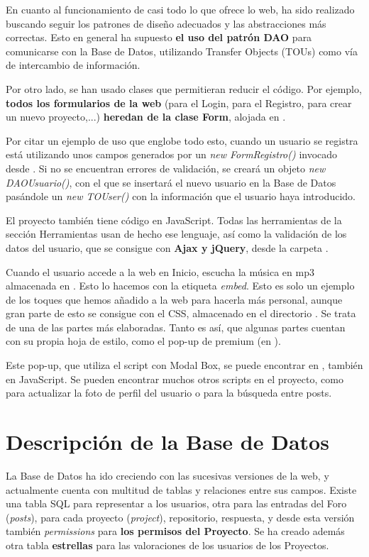 \documentclass[12pt]{report}
\begin{document}
En cuanto al funcionamiento de casi todo lo que ofrece lo web, ha sido realizado buscando seguir los patrones de diseño adecuados y las abstracciones más correctas. Esto en general ha supuesto \textbf{el uso del patrón DAO} para comunicarse con la Base de Datos, utilizando Transfer Objects (TOUs) como vía de intercambio de información.

Por otro lado, se han usado clases que permitieran reducir el código. Por ejemplo, \textbf{todos los formularios de la web} (para el Login, para el Registro, para crear un nuevo proyecto,...) \textbf{heredan de la clase Form}, alojada en .

Por citar un ejemplo de uso que englobe todo esto, cuando un usuario se registra está utilizando unos campos generados por un \textit{new FormRegistro()} invocado desde . Si no se encuentran errores de validación, se creará un objeto \textit{new DAOUsuario()}, con el que se insertará el nuevo usuario en la Base de Datos pasándole un \textit{new TOUser()} con la información que el usuario haya introducido.

El proyecto también tiene código en JavaScript. Todas las herramientas de la sección Herramientas usan de hecho ese lenguaje, así como la validación de los datos del usuario, que se consigue con \textbf{Ajax y jQuery}, desde la carpeta .

Cuando el usuario accede a la web en Inicio, escucha la música en mp3 almacenada en . Esto lo hacemos con la etiqueta \textit{embed}. Esto es solo un ejemplo de los toques que hemos añadido a la web para hacerla más personal, aunque gran parte de esto se consigue con el CSS, almacenado en el directorio . Se trata de una de las partes más elaboradas. Tanto es así, que algunas partes cuentan con su propia hoja de estilo, como el pop-up de premium (en ).

Este pop-up, que utiliza el script con Modal Box, se puede encontrar en , también en JavaScript. Se pueden encontrar muchos otros scripts en el proyecto, como  para actualizar la foto de perfil del usuario o  para la búsqueda entre posts.

\section{Descripción de la Base de Datos}

La Base de Datos ha ido creciendo con las sucesivas versiones de la web, y actualmente cuenta con multitud de tablas y relaciones entre sus campos. Existe una tabla SQL para representar a los usuarios, otra para las entradas del Foro (\textit{posts}), para cada proyecto (\textit{project}), repositorio, respuesta, y desde esta versión también \textit{permissions} para \textbf{los permisos del Proyecto}. Se ha creado además otra tabla \textbf{estrellas} para las valoraciones de los usuarios de los Proyectos.
\end{document}
